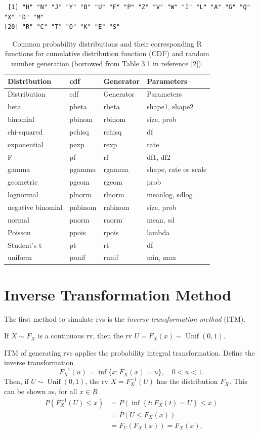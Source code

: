 \documentclass[
  letterpaper,
  DIV=11,
  numbers=noendperiod]{scrreprt}
\begin{document}
\begin{verbatim}
 [1] "H" "N" "J" "Y" "B" "U" "F" "P" "Z" "V" "W" "I" "L" "A" "G" "Q" "X" "D" "M"
[20] "R" "C" "T" "O" "K" "E" "S"
\end{verbatim}

\begin{longtable}[]{@{}llll@{}}
\caption{Common probability distributions and their corresponding R
functions for cumulative distribution function (CDF) and random number
generation (borrowed from Table 3.1 in reference
{[}2{]}).}\label{tbl-my-table}\tabularnewline
\toprule\noalign{}
Distribution & cdf & Generator & Parameters \\
\midrule\noalign{}
\endfirsthead
\toprule\noalign{}
Distribution & cdf & Generator & Parameters \\
\midrule\noalign{}
\endhead
\bottomrule\noalign{}
\endlastfoot
beta & pbeta & rbeta & shape1, shape2 \\
binomial & pbinom & rbinom & size, prob \\
chi-squared & pchisq & rchisq & df \\
exponential & pexp & rexp & rate \\
F & pf & rf & df1, df2 \\
gamma & pgamma & rgamma & shape, rate or scale \\
geometric & pgeom & rgeom & prob \\
lognormal & plnorm & rlnorm & meanlog, sdlog \\
negative binomial & pnbinom & rnbinom & size, prob \\
normal & pnorm & rnorm & mean, sd \\
Poisson & ppois & rpois & lambda \\
Student's t & pt & rt & df \\
uniform & punif & runif & min, max \\
\end{longtable}

\section{Inverse Transformation
Method}\label{inverse-transformation-method}

The first method to simulate rvs is the \emph{inverse transformation
method} (ITM).

If \(X\sim F_X\) is a continuous rv, then the rv
\(U = F_X(x) \sim \operatorname{Unif}(0,1)\).

ITM of generating rvs applies the probability integral transformation.
Define the inverse transformation
\[ F^{−1}_X(u) = \inf\{x : F_X(x) = u\},\quad  0 < u < 1.\] Then, if
\(U \sim \operatorname{Unif}(0,1)\), the rv \(X = F^{−1}_X(U)\) has the
distribution \(F_X\). This can be shown as, for all \(x \in R\)
\begin{align}
P\left(F_X^{-1}(U) \leq x\right) & =P\left(\inf \left\{t: F_X(t)=U\right\} \leq x\right) \\
& =P\left(U \leq F_X(x)\right) \\
& =F_U\left(F_X(x)\right)=F_X(x),
\end{align}
\end{document}
